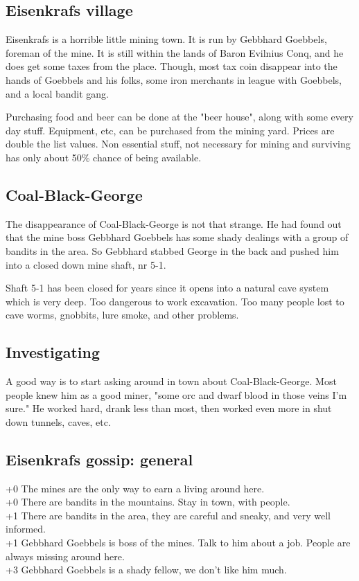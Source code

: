 \documentclass[11pt, twoside, titlepage, a4paper]{report}
\begin{document}
\subsection*{Eisenkrafs village}
Eisenkrafs is a horrible little mining town. It is run by Gebbhard Goebbels, foreman of the mine. It is still within the lands of Baron Evilnius Conq, and he does get some taxes from the place. Though, most tax coin disappear into the hands of Goebbels and his folks, some iron merchants in league with Goebbels, and a local bandit gang.

Purchasing food and beer can be done at the "beer house", along with some every day stuff. Equipment, etc, can be purchased from the mining yard. Prices are double the list values. Non essential stuff, not necessary for mining and surviving has only about 50\% chance of being available.


\subsection*{Coal-Black-George}
The disappearance of Coal-Black-George is not that strange. He had found out that the mine boss Gebbhard Goebbels has some shady dealings with a group of bandits in the area. So Gebbhard stabbed George in the back and pushed him into a closed down mine shaft, nr 5-1.

Shaft 5-1 has been closed for years since it opens into a natural cave system which is very deep. Too dangerous to work excavation. Too many people lost to cave worms, gnobbits, lure smoke, and other problems.


\subsection*{Investigating}
A good way is to start asking around in town about Coal-Black-George. Most people knew him as a good miner, "some orc and dwarf blood in those veins I'm sure." He worked hard, drank less than most, then worked even more in shut down tunnels, caves, etc.


\subsection*{Eisenkrafs gossip: general}
+0 The mines are the only way to earn a living around here. \\
+0 There are bandits in the mountains. Stay in town, with people. \\
+1 There are bandits in the area, they are careful and sneaky, and very well informed. \\
+1 Gebbhard Goebbels is boss of the mines. Talk to him about a job. People are always missing around here. \\
+3 Gebbhard Goebbels is a shady fellow, we don't like him much.
\end{document}
